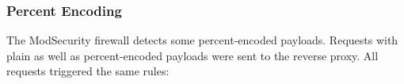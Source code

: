 %
%
%
%
%
%
%

\subsubsection{Percent Encoding}
\label{sec:percencsingleiter}
The ModSecurity firewall detects some percent-encoded payloads. Requests with plain as well as percent-encoded payloads were sent to the reverse proxy. All requests triggered the same rules:

